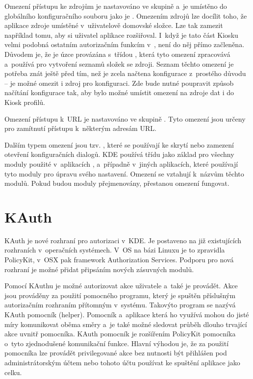 Omezení přístupu ke zdrojům je nastavováno ve skupině  a~je umístěno do globálního konfiguračního souboru jako je . Omezením zdrojů lze docílit toho, že aplikace  zdroje umístěné v~uživatelově domovské složce. Lze tak zamezit například tomu, aby si uživatel aplikace rozšiřoval. I~když je tato část Kiosku velmi podobná ostatním autorizačním funkcím v~, není do něj přímo začleněna. Důvodem je, že je úzce provázána s~třídou , která tyto omezení zpracovává a~používá pro vytvoření seznamů složek se zdroji. Seznam těchto omezení je potřeba znát ještě před tím, než je zcela načtena konfigurace z~prostého důvodu -- je možné omezit i zdroj pro konfiguraci. Zde bude nutné poupravit způsob načítání konfigurace tak, aby bylo možné umístit omezení na zdroje dat i do Kiosk profilů.

Omezení přístupu k~URL je nastavováno ve skupině . Tyto omezení jsou určeny pro zamítnutí přístupu k~některým adresám URL.

Dalším typem omezení jsou tzv. , které se používají ke skrytí nebo zamezení otevření konfiguračních dialogů. KDE používá třídu  jako základ pro všechny moduly použité v~aplikacích ,  a~případně v~jiných aplikacích, které používají tyto moduly pro úpravu svého nastavení. Omezení se vztahují k~názvům těchto modulů. Pokud budou moduly přejmenovány, přestanou omezení fungovat.

\section{KAuth}
KAuth je nové rozhraní pro autorizaci v~KDE. Je postaveno na již existujících rozhraních v~operačních systémech. V~OS na bázi Linuxu je to zpravidla PolicyKit, v~OSX pak framework Authorization Services. Podporu pro nová rozhraní je možné přidat připsáním nových zásuvných modulů.

Pomocí KAuthu je možné autorizovat akce uživatele a~také je provádět. Akce jsou prováděny za použití pomocného programu, který je spuštěn příslušným autorizačním rozhraním přítomným v~systému. Takovýto program se nazývá KAuth pomocník (helper). Pomocník a~aplikace která ho využívá mohou do jisté míry komunikovat oběma směry a~je také možné sledovat průběh dlouho trvající akce uvnitř pomocníka. KAuth pomocník je rozšířením PolicyKit pomocníka o~tyto zjednodušené komunikační funkce. Hlavní výhodou je, že za použití pomocníka lze provádět privilegované akce bez nutnosti být přihlášen pod administrátorským účtem nebo tohoto účtu používat ke spuštění aplikace jako celku.

